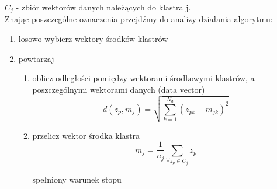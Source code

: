 \documentclass[twoside]{pracaMagisterskaMS}
\begin{document}
$C_j$ - zbiór wektorów danych należących do klastra j.\\


\noindent Znając poszczególne oznaczenia przejdźmy do analizy działania algorytmu:

\begin{enumerate}
\item losowo wybierz wektory środków klastrów
\item powtarzaj
	\begin{enumerate}
	\item 
	\begin{enumerate}
	oblicz odległości pomiędzy wektorami środkowymi klastrów, a poszczególnymi wektorami danych (data vector)
		\begin{equation*}
		d(z_p,m_j)= \sqrt{ \sum_{k=1}^{N_d} (z_{pk} - m_{jk})^2}
		\end{equation*}
	\end{enumerate}
\item 
	\begin{enumerate}
	przelicz wektor środka klastra
	\begin{equation*}
		 m_j = \frac {1}{n_j} \sum_{\forall z_p \in C_j } z_p
	\end{equation*}
\end{enumerate}
spełniony warunek stopu
	\end{enumerate}

\end{enumerate}




%
\end{document}
